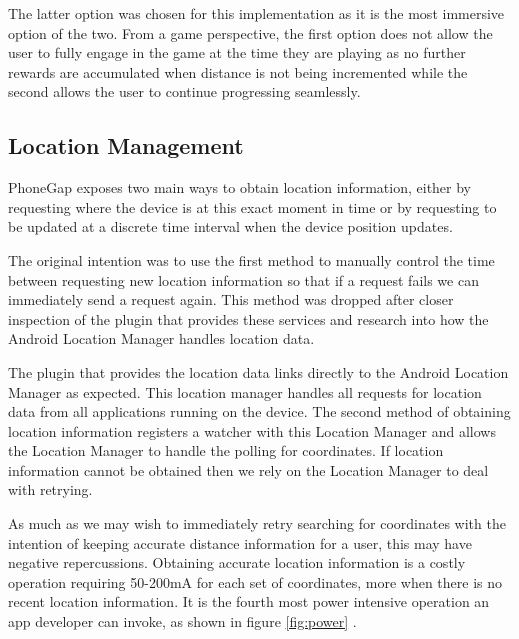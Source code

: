 The latter option was chosen for this implementation as it is the most
immersive option of the two. From a game perspective, the first option
does not allow the user to fully engage in the game at the time they
are playing as no further rewards are accumulated when distance is not
being incremented while the second allows the user to continue
progressing seamlessly. 

\subsection{Location Management}
\label{sec:location_mgmt}
PhoneGap exposes two main ways to obtain location information, either
by requesting where the device is at this exact moment in
time\cite{phonegap_currentpos} or by requesting to be updated at a
discrete time interval when the device position
updates\cite{phonegap_watchpos}. 

The original intention was to use the first method to manually control
the time between requesting new location information so that if a
request fails we can immediately send a request again. This method was
dropped after closer inspection of the plugin that provides these
services and research into how the Android Location Manager handles
location data.

The plugin that provides the location data links directly to the
Android Location Manager as expected. This location manager handles
all requests for location data from all applications running on the
device. The second method of obtaining location information registers
a watcher with this Location Manager and allows the Location Manager
to handle the polling for coordinates. If location information cannot
be obtained then we rely on the Location Manager to deal with
retrying. 

As much as we may wish to immediately retry searching for coordinates
with the intention of keeping accurate distance information for a
user, this may have negative repercussions. Obtaining accurate
location information is a costly operation requiring 50-200mA for each set
of coordinates, more when there is no recent location
information\cite{android_power}. It is the fourth most power intensive
operation an app developer can invoke, as shown in figure
\ref{fig:power} \cite{android_efficiencySlides}.

